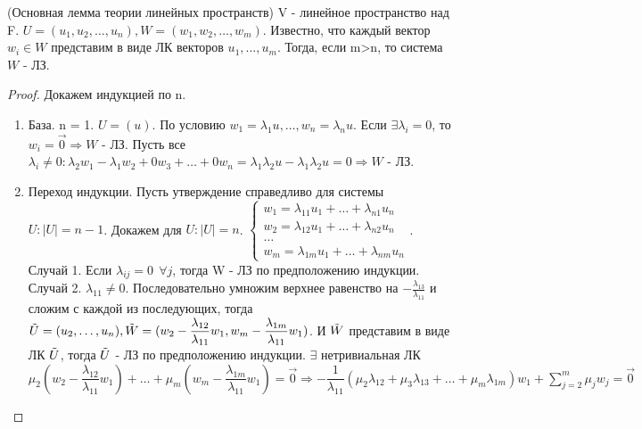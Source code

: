 \begin{lemma}
	(Основная лемма теории линейных пространств) \newline
	V - линейное пространство над F. \(U = (u_1, u_2,\ldots, u_n), W = (w_1, w_2,\ldots, w_m).\) Известно, что каждый вектор \(w_i\in W\) представим в виде ЛК векторов \(u_1, \ldots, u_m\). Тогда, если m>n, то система \(W\) - ЛЗ.
\end{lemma}
\begin{proof}
	Докажем индукцией по n. 
	\begin{enumerate}
		\item База. n = 1. \(U = (u)\). По условию \(w_1 = \lambda_1u, \ldots, w_n = \lambda_nu\). Если \(\exists \lambda_i = 0\), то \(w_i = \vec 0\Longrightarrow W\) - ЛЗ. Пусть все \(\lambda_i\ne0: \lambda_2w_1-\lambda_1w_2 + 0w_3 + \ldots + 0w_n = \lambda_1\lambda_2u - \lambda_1\lambda_2u = 0\Longrightarrow W\) - ЛЗ.
		\item Переход индукции. Пусть утверждение справедливо для системы  \(U: |U| = n -1\). Докажем для \(U: |U| = n\). \(\left\{\begin{gathered}
			w_1 = \lambda_{11}u_1 + \ldots + \lambda_{n1}u_n \\
			w_2 = \lambda_{12}u_1 + \ldots + \lambda_{n2}u_n \\
			\ldots \\
			w_m = \lambda_{1m}u_1 + \ldots + \lambda_{nm}u_n
		\end{gathered}\right.\). \newline
		Случай 1. Если \(\lambda_{ij} = 0 \> \> \forall j\), тогда W - ЛЗ по предположению индукции. \newline
		Случай 2. \(\lambda_{11}\ne 0\). Последовательно умножим верхнее равенство на \(-\frac{\lambda_{13}}{\lambda_{11}}\) и сложим с каждой из последующих, тогда \(\Tilde U = (u_2, \ldots, u_n), \Tilde W = (w_2 - \dfrac{\lambda_{12}}{\lambda_{11}}w_1, w_m - \dfrac{\lambda_{1m}}{\lambda_{11}}w_1)\). И \(\Tilde{W}\) представим в виде ЛК \(\Tilde{U}\), тогда \(\Tilde{U}\) - ЛЗ по предположению индукции. \(\exists \) нетривиальная ЛК \(\mu_2(w_2 - \dfrac{\lambda_{12}}{\lambda_{11}}w_1) + \ldots + \mu_m( w_m - \dfrac{\lambda_{1m}}{\lambda_{11}}w_1) = \vec 0 \Longrightarrow -\dfrac{1}{\lambda_{11}}(\mu_2\lambda_{12} + \mu_3\lambda_{13} + \ldots + \mu_m\lambda_{1m})w_1 + \sum_{j=2}^{m}\mu_jw_j=\vec 0\)
	\end{enumerate}
\end{proof}
